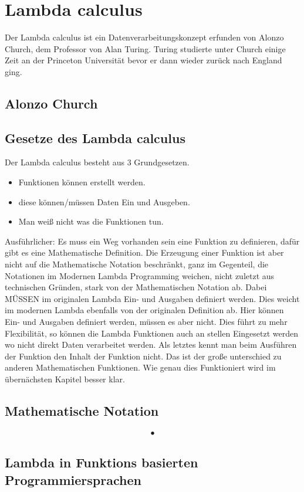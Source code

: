 \section{Lambda calculus}
Der Lambda calculus ist ein Datenverarbeitungskonzept erfunden von Alonzo Church, dem Professor von Alan Turing. Turing studierte unter Church einige Zeit an der Princeton Universität bevor er dann wieder zurück nach England ging.
\subsection{Alonzo Church}
\subsection{Gesetze des Lambda calculus}
Der Lambda calculus besteht aus 3 Grundgesetzen.
\begin{itemize}
\item Funktionen können erstellt werden.
\item diese können/müssen Daten Ein und Ausgeben.
\item Man weiß nicht was die Funktionen tun.
\end{itemize}
Ausführlicher: Es muss ein Weg vorhanden sein eine Funktion zu definieren, dafür gibt es eine Mathematische Definition. Die Erzeugung einer Funktion ist aber nicht auf die Mathematische Notation beschränkt, ganz im Gegenteil, die Notationen im Modernen Lambda Programming weichen, nicht zuletzt aus technischen Gründen, stark von der Mathematischen Notation ab. Dabei MÜSSEN im originalen Lambda Ein- und Ausgaben definiert werden. Dies weicht im modernen Lambda ebenfalls von der originalen Definition ab. Hier können Ein- und Ausgaben definiert werden, müssen es aber nicht. Dies führt zu mehr Flexibilität, so können die Lambda Funktionen auch an stellen Eingesetzt werden wo nicht direkt Daten verarbeitet werden. Als letztes kennt man beim Ausführen der Funktion den Inhalt der Funktion nicht. Das ist der große unterschied zu anderen Mathematischen Funktionen. Wie genau dies Funktioniert wird im übernächsten Kapitel besser klar.
\subsection{Mathematische Notation}
\begin{eqnarray}
•
\end{eqnarray}
\subsection{Lambda in Funktions basierten Programmiersprachen }